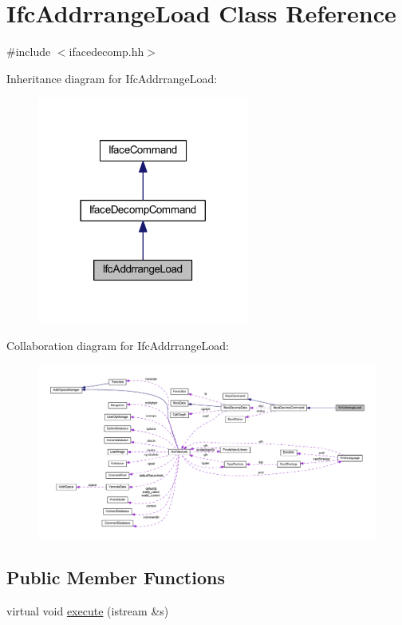 \hypertarget{class_ifc_addrrange_load}{}\section{Ifc\+Addrrange\+Load Class Reference}
\label{class_ifc_addrrange_load}


{\ttfamily \#include $<$ifacedecomp.\+hh$>$}



Inheritance diagram for Ifc\+Addrrange\+Load\+:
\nopagebreak
\begin{figure}[H]
\begin{center}
\leavevmode
\includegraphics[width=197pt]{class_ifc_addrrange_load__inherit__graph}
\end{center}
\end{figure}


Collaboration diagram for Ifc\+Addrrange\+Load\+:
\nopagebreak
\begin{figure}[H]
\begin{center}
\leavevmode
\includegraphics[width=350pt]{class_ifc_addrrange_load__coll__graph}
\end{center}
\end{figure}
\subsection*{Public Member Functions}
\begin{DoxyCompactItemize}
\item 
virtual void \mbox{\hyperlink{class_ifc_addrrange_load_ae9d83583bd9d087d4b821dd3055968d0}{execute}} (istream \&s)
\end{DoxyCompactItemize}

